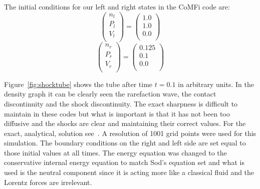 \documentclass[12pt,upcase]{umlthesis}
\begin{document}
The initial conditions for our left and right states in the CoMFi code are:
\begin{equation}\label{eq:shockinitialconditionsl}
	\begin{pmatrix}
		n_l \\
		P_l \\
		V_l \\
	\end{pmatrix}
	=
	\begin{pmatrix}
		1.0 \\
		1.0 \\
		0.0 \\
	\end{pmatrix}
\end{equation}
\begin{equation}\label{eq:shockinitialconditionsr}
	\begin{pmatrix}
		n_r \\
		P_r \\
		V_r \\
	\end{pmatrix}
	=
	\begin{pmatrix}
		0.125 \\
		0.1 \\
		0.0 \\
	\end{pmatrix}
\end{equation}
	
Figure~\ref{fig:shocktube} shows the tube after time $t = 0.1$ in arbitrary units. In the density graph it can be clearly seen the rarefaction wave, the contact discontinuity and the shock discontinuity. The exact sharpness is difficult to maintain in these codes but what is important is that it has not been too diffusive and the shocks are clear and maintaining their correct values. For the exact, analytical, solution see~\citet{Sod1978}. A resolution of 1001 grid points were used for this simulation. The boundary conditions on the right and left side are set equal to those initial values at all times. The energy equation was changed to the conservative internal energy equation to match Sod's equation set and what is used is the neutral component since it is acting more like a classical fluid and the Lorentz forces are irrelevant.
\end{document}
